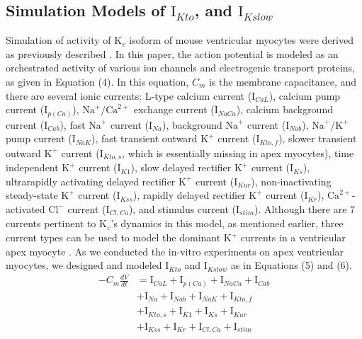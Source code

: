 \documentclass[journal]{IEEEtran}
\begin{document}
\subsection{Simulation Models of $\text{I}_{Kto}$, and $\text{I}_{Kslow}$}
Simulation of activity of $\text{K}_{v}$ isoform of mouse ventricular myocytes were derived as previously described \cite{bondarenko2004computer}. In this paper, the action potential is modeled as an orchestrated activity of various ion channels and electrogenic transport proteins, as given in Equation (4). In this equation, $C_m$ is the membrane capacitance, and there are several ionic currents: L-type calcium current ($\text{I}_{CaL}$), calcium pump current ($\text{I}_{p(Ca)}$), $\text{Na}^{+}/\text{Ca}^{2+}$ exchange current ($\text{I}_{NaCa}$), calcium background current ($\text{I}_{Cab}$), fast $\text{Na}^{+}$ current ($\text{I}_{Na}$), background $\text{Na}^{+}$ current ($\text{I}_{Nab}$), $\text{Na}^{+}/\text{K}^{+}$ pump current ($\text{I}_{NaK}$), fast transient outward $\text{K}^{+}$ current ($\text{I}_{Kto,f}$), slower transient outward $\text{K}^{+}$ current ($\text{I}_{Kto,s}$, which is essentially missing in apex myocytes), time independent $\text{K}^{+}$ current ($\text{I}_{K1}$), slow delayed rectifier $\text{K}^{+}$ current ($\text{I}_{Ks}$), ultrarapidly activating delayed rectifier $\text{K}^{+}$ current ($\text{I}_{Kur}$), non-inactivating steady-state $\text{K}^{+}$ current ($\text{I}_{Kss}$), rapidly delayed rectifier $\text{K}^{+}$ current ($\text{I}_{Kr}$), $\text{Ca}^{2+}$-activated $\text{Cl}^{-}$ current ($\text{I}_{Cl,Ca}$), and stimulus current ($\text{I}_{stim}$). Although there are 7 currents pertinent to $\text{K}_{v}$'s dynamics in this model, as mentioned earlier, three current types can be used to model the dominant $\text{K}^{+}$ currents in a ventricular apex myocyte \cite{nerbonne2005molecular}. As we conducted the in-vitro experiments on apex ventricular myocytes, we designed and modeled $\text{I}_{Kto}$ and $\text{I}_{Kslow}$ as in Equations (5) and (6).
\begin{equation}
\begin{split}
    -C_{m}\frac{dV}{dt} &= \text{I}_{CaL}+\text{I}_{p(Ca)}+\text{I}_{NaCa}+\text{I}_{Cab}\\
    &+\text{I}_{Na}+\text{I}_{Nab}+\text{I}_{NaK}+\text{I}_{Kto,f}\\
    &+\text{I}_{Kto,s}+\text{I}_{K1}+\text{I}_{Ks}+\text{I}_{Kur}\\
    &+\text{I}_{Kss}+\text{I}_{Kr}+\text{I}_{Cl,Ca}+\text{I}_{stim}
\end{split}
\end{equation}
\end{document}
